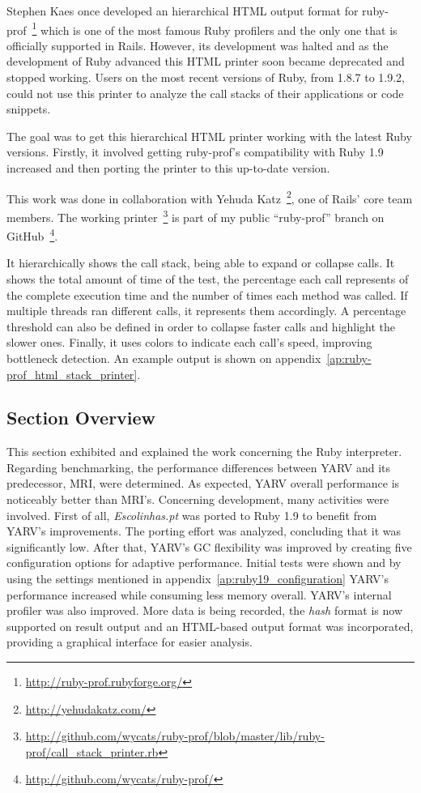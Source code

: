 Stephen Kaes once developed an hierarchical HTML output format for ruby-prof~\footnote{\url{http://ruby-prof.rubyforge.org/}} which is one of the most famous Ruby profilers and the only one that is officially supported in Rails. However, its development was halted and as the development of Ruby advanced this HTML printer soon became deprecated and stopped working. Users on the most recent versions of Ruby, from 1.8.7 to 1.9.2, could not use this printer to analyze the call stacks of their applications or code snippets.

The goal was to get this hierarchical HTML printer working with the latest Ruby versions. Firstly, it involved getting ruby-prof's compatibility with Ruby 1.9 increased and then porting the printer to this up-to-date version.

This work was done in collaboration with Yehuda Katz~\footnote{\url{http://yehudakatz.com/}}, one of Rails' core team members. The working printer~\footnote{\url{http://github.com/wycats/ruby-prof/blob/master/lib/ruby-prof/call_stack_printer.rb}} is part of my public ``ruby-prof'' branch on GitHub~\footnote{\url{http://github.com/wycats/ruby-prof/}}.

It hierarchically shows the call stack, being able to expand or collapse calls. It shows the total amount of time of the test, the percentage each call represents of the complete execution time and the number of times each method was called. If multiple threads ran different calls, it represents them accordingly. A percentage threshold can also be defined in order to collapse faster calls and highlight the slower ones. Finally, it uses colors to indicate each call's speed, improving bottleneck detection. An example output is shown on appendix~\ref{ap:ruby-prof_html_stack_printer}.


\subsection{Section Overview}
This section exhibited and explained the work concerning the Ruby interpreter. Regarding benchmarking, the performance differences between YARV and its predecessor, MRI, were determined. As expected, YARV overall performance is noticeably better than MRI's. Concerning development, many activities were involved. First of all, \textit{Escolinhas.pt} was ported to Ruby 1.9 to benefit from YARV's improvements. The porting effort was analyzed, concluding that it was significantly low. After that, YARV's GC flexibility was improved by creating five configuration options for adaptive performance. Initial tests were shown and by using the settings mentioned in appendix~\ref{ap:ruby19_configuration} YARV's performance increased while consuming less memory overall. YARV's internal profiler was also improved. More data is being recorded, the \textit{hash} format is now supported on result output and an HTML-based output format was incorporated, providing a graphical interface for easier analysis.
